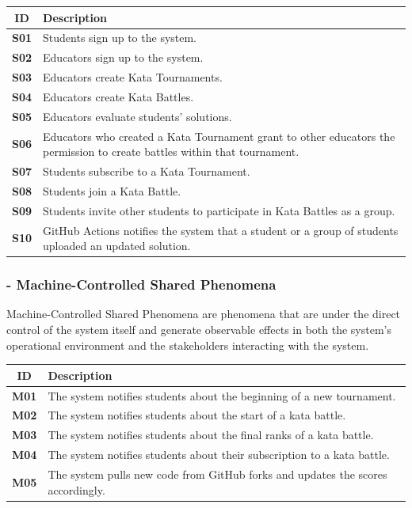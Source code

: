 \documentclass[11pt]{report}
\begin{document}
    \begin{center}
    \begin{tabular}{|c|p{12cm}|}
    \hline
    \rowcolor{gray!20} %
    \textbf{ID} & \textbf{Description} \\ \hline
    \textbf{S01} & Students sign up to the system. \\
    \hline
    \textbf{S02} & Educators sign up to the system. \\
    \hline
    \textbf{S03} & Educators create Kata Tournaments. \\
    \hline
    \textbf{S04} & Educators create Kata Battles. \\
    \hline
    \textbf{S05} & Educators evaluate students' solutions. \\
    \hline
    \textbf{S06} & Educators who created a Kata Tournament grant to other educators the permission to create battles within that tournament. \\
    \hline
    \textbf{S07} & Students subscribe to a Kata Tournament. \\
    \hline
    \textbf{S08} & Students join a Kata Battle. \\
    \hline
    \textbf{S09} & Students invite other students to participate in Kata Battles as a group. \\
    \hline
    \textbf{S10} & GitHub Actions notifies the system that a student or a group of students uploaded an updated solution. \\
    \hline
    \end{tabular}
    \end{center}

    \subsubsection*{- Machine-Controlled Shared Phenomena}
    Machine-Controlled Shared Phenomena are phenomena that are under the direct control of the system itself and generate observable
    effects in both the system's operational environment and the stakeholders interacting with the system.

    \begin{center}
    \begin{tabular}{|c|p{12cm}|}
    \hline
    \rowcolor{gray!20} %
    \textbf{ID} & \textbf{Description} \\ \hline
    \textbf{M01} & The system notifies students about the beginning of a new tournament. \\
    \hline
    \textbf{M02} & The system notifies students about the start of a kata battle. \\
    \hline
    \textbf{M03} & The system notifies students about the final ranks of a kata battle. \\
    \hline
    \textbf{M04} & The system notifies students about their subscription to a kata battle. \\
    \hline
    \textbf{M05} & The system pulls new code from GitHub forks and updates the scores accordingly. \\
    \hline
    \end{tabular}
    \end{center}
\end{document}
